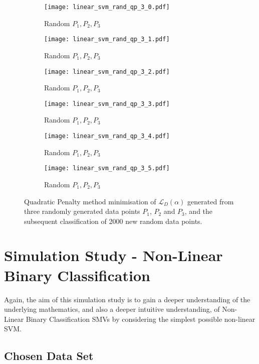 \documentclass[10pt, a4paper,reqno]{amsart}
\begin{document}
\begin{figure}[H]
	\centering	
	\begin{subfigure}{0.5\textwidth}
		\centering
		\texttt{[image: linear\_svm\_rand\_qp\_3\_0.pdf]}
		\caption{Random $P_1, P_2, P_3$}
	\end{subfigure}%
	\begin{subfigure}{0.5\textwidth}
		\centering
		\texttt{[image: linear\_svm\_rand\_qp\_3\_1.pdf]}
		\caption{Random $P_1, P_2, P_3$}
	\end{subfigure}
	\begin{subfigure}{0.5\textwidth}
		\centering
		\texttt{[image: linear\_svm\_rand\_qp\_3\_2.pdf]}
		\caption{Random $P_1, P_2, P_3$}
	\end{subfigure}%
	\begin{subfigure}{0.5\textwidth}
		\centering
		\texttt{[image: linear\_svm\_rand\_qp\_3\_3.pdf]}
		\caption{Random $P_1, P_2, P_3$}
	\end{subfigure}
	\begin{subfigure}{0.5\textwidth}
		\centering
		\texttt{[image: linear\_svm\_rand\_qp\_3\_4.pdf]}
		\caption{Random $P_1, P_2, P_3$}
	\end{subfigure}%
	\begin{subfigure}{0.5\textwidth}
		\centering
		\texttt{[image: linear\_svm\_rand\_qp\_3\_5.pdf]}
		\caption{Random $P_1, P_2, P_3$}
	\end{subfigure}
	\caption{Quadratic Penalty method minimisation of $\mathcal{L}_D(\alpha)$ generated from three randomly generated data points $P_1$, $P_2$ and $P_3$, and the subsequent classification of 2000 new random data points.}
\end{figure}


%
%
\clearpage\section{Simulation Study - Non-Linear Binary Classification}

Again, the aim of this simulation study is to gain a deeper understanding of the underlying mathematics, and also a deeper intuitive understanding, of Non-Linear Binary Classification SMVs by considering the simplest possible non-linear SVM.

\subsection{Chosen Data Set}
\end{document}
